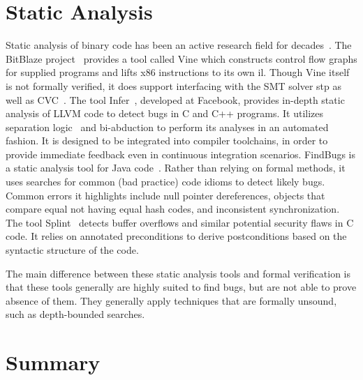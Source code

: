 \section{Static Analysis}
Static analysis of binary code has been an active research field for decades~\cite{kruegel2005automating,brumley2011bap,wang2017angr}.
The BitBlaze project~\citep{song2008bitblaze}
provides a tool called Vine which constructs control flow graphs for supplied programs and lifts x86 instructions to its own \ac{il}.
Though Vine itself is not formally verified, it does support interfacing with the SMT solver \ac{stp} as well as CVC~\citep{barrett2004cvcl,barrett2007cvc3}.
The tool Infer~\citep{calcagno2011infer}, developed at Facebook, provides in-depth static analysis of LLVM code to detect bugs in C and C++ programs.
It utilizes separation logic~\citep{reynolds2002separation} and bi-abduction to perform its analyses in an automated fashion.
It is designed to be integrated into compiler toolchains, in order to provide immediate feedback even in continuous integration scenarios.
FindBugs is a static analysis tool for Java code~\citep{hovemeyer2004findbugs}.
Rather than relying on formal methods, it uses searches for common (bad practice) code idioms to detect likely bugs.
Common errors it highlights include null pointer dereferences,
objects that compare equal not having equal hash codes,
and inconsistent synchronization.
The tool Splint~\citep{evans2002static} detects buffer overflows
and similar potential security flaws in C code.
It relies on annotated preconditions to derive postconditions
based on the syntactic structure of the code.

The main difference between these static analysis tools and formal verification
is that these tools generally are highly suited to find bugs,
but are not able to prove absence of them.
They generally apply techniques that are formally unsound, such as depth-bounded searches.

\section{Summary}
